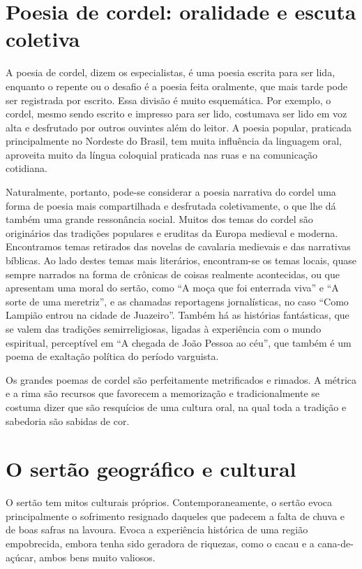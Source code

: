 \pagebreak
\section{Poesia de cordel: oralidade e escuta coletiva}

A poesia de cordel, dizem os especialistas, é uma poesia escrita para
ser lida, enquanto o repente ou o desafio é a poesia feita oralmente,
que mais tarde pode ser registrada por escrito. Essa divisão é muito
esquemática. Por exemplo, o cordel, mesmo sendo escrito e impresso para
ser lido, costumava ser lido em voz alta e desfrutado por outros
ouvintes além do leitor. A poesia popular, praticada principalmente no
Nordeste do Brasil, tem muita influência da linguagem oral, aproveita
muito da língua coloquial praticada nas ruas e na comunicação
cotidiana. 

Naturalmente, portanto, pode-se considerar a poesia narrativa do cordel
uma forma de poesia mais compartilhada e desfrutada coletivamente, o
que lhe dá também uma grande ressonância social. Muitos dos temas do
cordel são originários das tradições populares e eruditas da Europa
medieval e moderna. Encontramos temas retirados das novelas de
cavalaria medievais e das narrativas bíblicas. Ao lado destes temas
mais literários, encontram-se os temas locais, quase sempre narrados na
forma de crônicas de coisas realmente acontecidas, ou que apresentam
uma moral do sertão, como ``A moça que foi enterrada
viva'' e ``A sorte de uma
meretriz'', e as chamadas reportagens jornalísticas,
no caso ``Como Lampião entrou na cidade de
Juazeiro''. Também há as histórias fantásticas, que
se valem das tradições semirreligiosas, ligadas à experiência com o
mundo espiritual, perceptível em ``A chegada de João
Pessoa ao céu'', que também é um poema de exaltação
política do período varguista. 

Os grandes poemas de cordel são perfeitamente metrificados e rimados. A
métrica e a rima são recursos que favorecem a memorização e
tradicionalmente se costuma dizer que são resquícios de uma cultura
oral, na qual toda a tradição e sabedoria são sabidas de cor.

\section{O sertão geográfico e cultural}

O sertão tem mitos culturais próprios. Contemporaneamente, o sertão
evoca principalmente o sofrimento resignado daqueles que padecem a
falta de chuva e de boas safras na lavoura. Evoca a experiência
histórica de uma região empobrecida, embora tenha sido geradora de
riquezas, como o cacau e a cana-de-açúcar, ambos bens muito valiosos. 

